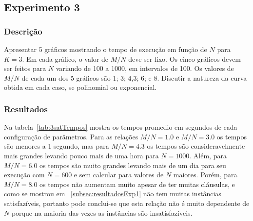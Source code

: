 		
\subsection{Experimento 3}
	\subsubsection{Descrição}
		Apresentar 5 gráficos mostrando o tempo de execução em função de $N$ para $K = 3$. Em cada gráfico, o valor de $M / N$ deve ser fixo. Os cinco gráficos devem ser feitos para $N$ variando de 100 a 1000, em intervalos de 100. Os valores de $M / N$ de cada um dos 5 gráficos são 1; 3; 4,3; 6; e 8. Discutir a natureza da curva obtida em cada caso, se polinomial ou exponencial. 
	\subsubsection{Resultados}
		Na tabela~\ref{tab:3satTempos} mostra os tempos promedio em segundos de cada configuração de parâmetros. Para as relações $M/N=1.0$ e $M/N=3.0$ os tempos são menores a 1 segundo, mas para $M/N=4.3$ os tempos são consideravelmente mais grandes levando pouco mais de uma hora para $N=1000$. Além, para $M/N=6.0$ os tempos são muito grandes levando mais de um dia para seu execução com $N=600$ e sem calcular para valores de $N$ maiores. Porém, para $M/N=8.0$ os tempos não aumentam muito apesar de ter muitas cláusulas, e como se mostrou em ~\ref{subsec:resultadosExp1} não tem muitas instâncias satisfazíveis, portanto pode conclui-se que esta relação não é muito dependente de $N$ porque na maioria das vezes as instâncias são insatisfazíveis.
